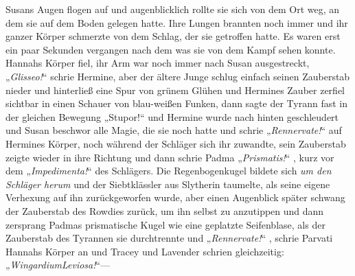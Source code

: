Susans Augen flogen auf und augenblicklich rollte sie sich von dem Ort weg, an dem sie auf dem Boden gelegen hatte. Ihre Lungen brannten noch immer und ihr ganzer Körper schmerzte von dem Schlag, der sie getroffen hatte. Es waren erst ein paar Sekunden vergangen nach dem was sie von dem Kampf sehen konnte. Hannahs Körper fiel, ihr Arm war noch immer nach Susan ausgestreckt, „\emph{Glisseo!}“ schrie Hermine, aber der ältere Junge schlug einfach seinen Zauberstab nieder und hinterließ eine Spur von grünem Glühen und Hermines Zauber zerfiel sichtbar in einen Schauer von blau-weißen Funken, dann sagte der Tyrann fast in der gleichen Bewegung „Stupor!“ und Hermine wurde nach hinten geschleudert und Susan beschwor alle Magie, die sie noch hatte und schrie „\emph{Rennervate!}“ auf Hermines Körper, noch während der Schläger sich ihr zuwandte, sein Zauberstab zeigte wieder in ihre Richtung und dann schrie Padma „\emph{Prismatis!}“ , kurz vor dem „\emph{Impedimenta!}“ des Schlägers. Die Regenbogenkugel bildete sich \emph{um den} \emph{Schläger herum} und der Siebtklässler aus Slytherin taumelte, als seine eigene Verhexung auf ihn zurückgeworfen wurde, aber einen Augenblick später schwang der Zauberstab des Rowdies zurück, um ihn selbst zu anzutippen und dann zersprang Padmas prismatische Kugel wie eine geplatzte Seifenblase, als der Zauberstab des Tyrannen sie durchtrennte und „\emph{Rennervate!}“ , schrie Parvati Hannahs Körper an und Tracey und Lavender schrien gleichzeitig: „\emph{WingardiumLeviosa!}“—

